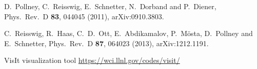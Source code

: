 \documentclass{article}
\begin{document}
\begin{thebibliography}{20}
  D.~Pollney, C.~Reisswig, E.~Schnetter, N.~Dorband and P.~Diener,
  Phys.\ Rev.\ D {\bf 83}, 044045 (2011), arXiv:0910.3803.

  C.~Reisswig, R.~Haas, C.~D.~Ott, E.~Abdikamalov, P.~Mösta, D.~Pollney and E.~Schnetter,
  Phys.\ Rev.\ D {\bf 87}, 064023 (2013), arXiv:1212.1191.

{VisIt} visualization tool \url{https://wci.llnl.gov/codes/visit/}

\end{thebibliography}

\end{document}
